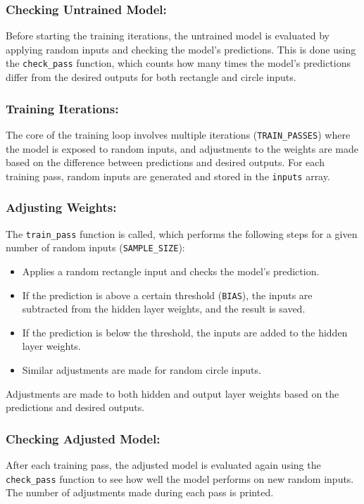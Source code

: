 \documentclass{article}
\begin{document}
\subsubsection*{Checking Untrained Model:}
Before starting the training iterations, the untrained model is evaluated by applying random inputs and checking the model's predictions. This is done using the \texttt{check\_pass} function, which counts how many times the model's predictions differ from the desired outputs for both rectangle and circle inputs.

\subsubsection*{Training Iterations:}
The core of the training loop involves multiple iterations (\texttt{TRAIN\_PASSES}) where the model is exposed to random inputs, and adjustments to the weights are made based on the difference between predictions and desired outputs. For each training pass, random inputs are generated and stored in the \texttt{inputs} array.

\subsubsection*{Adjusting Weights:}
The \texttt{train\_pass} function is called, which performs the following steps for a given number of random inputs (\texttt{SAMPLE\_SIZE}):
\begin{itemize}
    \item Applies a random rectangle input and checks the model's prediction.
    \item If the prediction is above a certain threshold (\texttt{BIAS}), the inputs are subtracted from the hidden layer weights, and the result is saved.
    \item If the prediction is below the threshold, the inputs are added to the hidden layer weights.
    \item Similar adjustments are made for random circle inputs.
\end{itemize}
Adjustments are made to both hidden and output layer weights based on the predictions and desired outputs.

\subsubsection*{Checking Adjusted Model:}
After each training pass, the adjusted model is evaluated again using the \texttt{check\_pass} function to see how well the model performs on new random inputs. The number of adjustments made during each pass is printed.
\end{document}
